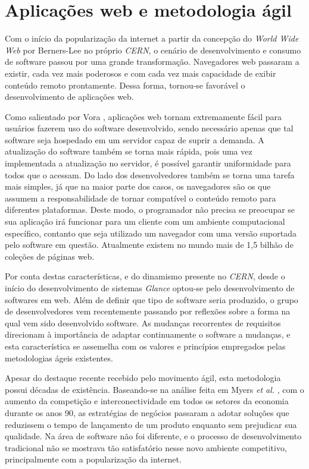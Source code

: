\section{Aplicações web e metodologia ágil}
Com o início da popularização da internet a partir da concepção do \emph{World Wide Web} por Berners-Lee \cite{Berners-Lee} no próprio \emph{CERN}, o cenário de desenvolvimento e consumo de software passou por uma grande transformação. Navegadores web passaram a existir, cada vez mais poderosos e com cada vez mais capacidade de exibir conteúdo remoto prontamente. Dessa forma, tornou-se favorável o desenvolvimento de aplicações web.

Como salientado por Vora \cite{vora}, aplicações web tornam extremamente fácil para usuários fazerem uso do software desenvolvido, sendo necessário apenas que tal software seja hospedado em um servidor capaz de suprir a demanda. A atualização do software também se torna mais rápida, pois uma vez implementada a atualização no servidor, é possível garantir uniformidade para todos que o acessam. Do lado dos desenvolvedores também se torna uma tarefa mais simples, já que na maior parte dos casos, os navegadores são os que assumem a responsabilidade de tornar compatível o conteúdo remoto para diferentes plataformas. Deste modo, o programador não precisa se preocupar se sua aplicação irá funcionar para um cliente com um ambiente computacional específico, contanto que seja utilizado um navegador com uma versão suportada pelo software em questão. Atualmente existem no mundo mais de 1,5 bilhão de coleções de páginas web.

Por conta destas características, e do dinamismo presente no \emph{CERN}, desde o início do desenvolvimento de sistemas \emph{Glance} optou-se pelo desenvolvimento de softwares em web. Além de definir que tipo de software seria produzido, o grupo de desenvolvedores vem recentemente passando por reflexões sobre a forma na qual vem sido desenvolvido software. As mudanças recorrentes de requisitos direcionam à importância de adaptar continuamente o software a mudanças, e esta característica se assemelha com os valores e princípios empregados pelas metodologias ágeis existentes.

Apesar do destaque recente recebido pelo movimento ágil, esta metodologia possui décadas de existência. Baseando-se na análise feita em Myers \emph{et al.} \cite{myers}, com o aumento da competição e interconectividade em todos os setores da economia durante os anos 90, as estratégias de negócios passaram a adotar soluções que reduzissem o tempo de lançamento de um produto enquanto sem prejudicar sua qualidade. Na área de software não foi diferente, e o processo de desenvolvimento tradicional não se mostrava tão satisfatório nesse novo ambiente competitivo, principalmente com a popularização da internet.

